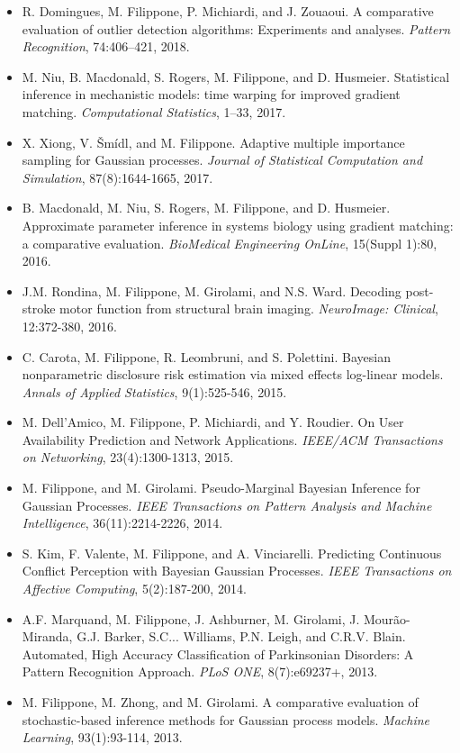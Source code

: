 \begin{itemize}
\item  R. Domingues, M. Filippone, P. Michiardi, and J. Zouaoui. A comparative evaluation of outlier detection algorithms: Experiments and analyses. \emph{Pattern Recognition}, 74:406--421, 2018.
\item  M. Niu, B. Macdonald, S. Rogers, M. Filippone, and D. Husmeier. Statistical inference in mechanistic models: time warping for improved gradient matching. \emph{Computational Statistics}, 1--33, 2017.
\item  X. Xiong, V. \v{S}m\'idl, and M. Filippone. Adaptive multiple importance sampling for {G}aussian processes. \emph{Journal of Statistical Computation and Simulation}, 87(8):1644-1665, 2017.
\item  B. Macdonald, M. Niu, S. Rogers, M. Filippone, and D. Husmeier. Approximate parameter inference in systems biology using gradient matching: a comparative evaluation. \emph{BioMedical Engineering OnLine}, 15(Suppl 1):80, 2016.
\item  J.M. Rondina, M. Filippone, M. Girolami, and N.S. Ward. Decoding post-stroke motor function from structural brain imaging. \emph{NeuroImage: Clinical}, 12:372-380, 2016.
\item  C. Carota, M. Filippone, R. Leombruni, and S. Polettini. Bayesian nonparametric disclosure risk estimation via mixed effects log-linear models. \emph{Annals of Applied Statistics}, 9(1):525-546, 2015.
\item  M. Dell'Amico, M. Filippone, P. Michiardi, and Y. Roudier. On User Availability Prediction and Network Applications. \emph{IEEE/ACM Transactions on Networking}, 23(4):1300-1313, 2015.
\item  M. Filippone, and M. Girolami. Pseudo-Marginal {B}ayesian Inference for {G}aussian Processes. \emph{IEEE Transactions on Pattern Analysis and Machine Intelligence}, 36(11):2214-2226, 2014.
\item  S. Kim, F. Valente, M. Filippone, and A. Vinciarelli. Predicting Continuous Conflict Perception with {B}ayesian {G}aussian Processes. \emph{IEEE Transactions on Affective Computing}, 5(2):187-200, 2014.
\item  A.F. Marquand, M. Filippone, J. Ashburner, M. Girolami, J. {Mour\~{a}o-Miranda}, G.J. Barker, S.C... Williams, P.N. Leigh, and C.R.V. Blain. {Automated, High Accuracy Classification of Parkinsonian Disorders: A Pattern Recognition Approach}. \emph{PLoS ONE}, 8(7):e69237+, 2013.
\item  M. Filippone, M. Zhong, and M. Girolami. A comparative evaluation of stochastic-based inference methods for {G}aussian process models. \emph{Machine Learning}, 93(1):93-114, 2013.

\end{itemize}
